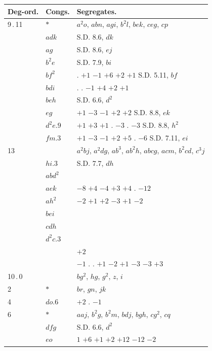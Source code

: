 \documentclass[11pt]{article}
\begin{document}
\begin{center}
\begin{tabular}{lll}
Deg-ord. & Congs. & Segregates. \\
\hline
9\,.\,11 & $*$ & $a^{2}o$, $abn$, $agi$, $b^{2}l$, $bek$, $ceg$, $cp$ \\
& $adk$ & \quad\quad\quad\quad\quad\quad S.D. 8.6, $dk$ \\
& $ag$ & \quad\quad\quad\quad\quad\quad S.D. 8.6, $ej$ \\
& $b^{2}e$ & \quad\quad\quad\quad\quad\quad S.D. 7.9, $bi$ \\
& $bf^{2}$ & \quad . \quad $+1$ $-1$ $+6$ $+2$ $+1$ \quad S.D. 5.11, $bf$ \\
& $bdi$ & \quad . \quad . \quad $-1$ $+4$ $+2$ $+1$ \\
& $beh$ & \quad\quad\quad\quad\quad\quad S.D. 6.6, $d^{2}$ \\
& $eg$ & $+1$ $-3$ $-1$ $+2$ $+2$ \quad\quad S.D. 8.8, $ek$ \\
& $d^{2}e.9$ & $+1$ $+3$ $+1$ \quad . \quad $-3$ \quad . \quad $-3$ \quad S.D. 8.8, $h^{2}$ \\
& $fm.3$ & $+1$ $-3$ $-1$ $+2$ $+5$ \quad . \quad $-6$ \quad S.D. 7.11, $ei$ \\
13 & & $a^{2}bj$, $a^{2}dg$, $ab^{3}$, $ab^{2}h$, $abcg$, $acm$, $b^{2}cd$, $c^{3}j$ \\
& $hi.3$ & \quad\quad\quad\quad\quad\quad S.D. 7.7, $dh$ \\
& $abd^{2}$ & \\
& $aek$ & $-8$ $+4$ $-4$ $+3$ $+4$ \quad . \quad $-12$ \\
& $ah^{2}$ & $-2$ $+1$ $+2$ $-3$ $+1$ $-2$ \\
& $bei$ & \\
& $cdh$ & \\
& $d^{2}c.3$ & \\
& & \quad\quad\quad\quad\quad\quad $+2$ \\
& & $-1$ \quad . \quad . \quad $+1$ $-2$ $+1$ $-3$ $-3$ $+3$ \\
\hline
10\,.\,0 & & $bg^{2}$, $hg$, $g^{2}$, $z$, $i$ \\
2 & $*$ & $br$, $gn$, $jk$ \\
4 & $do$.6 & $+2$ \quad . \quad $-1$ \\
6 & $*$ & $aaj$, $b^{2}g$, $b^{2}m$, $bdj$, $bgh$, $cg^{2}$, $cq$ \\
& $dfg$ & \quad\quad\quad\quad\quad\quad S.D. 6.6, $d^{2}$ \\
& $eo$ & $1$ $+6$ $+1$ $+2$ $+12$ $-12$ $-2$ \\

\end{tabular}
\end{center}
\end{document}
